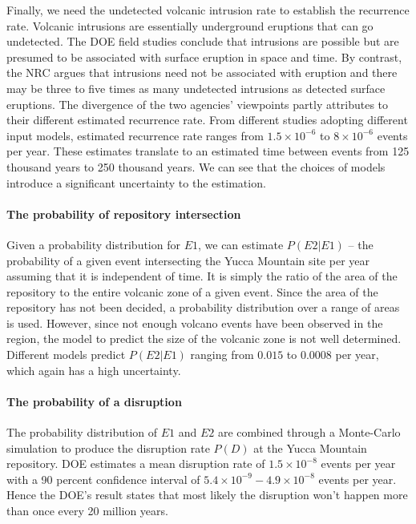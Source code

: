 \documentclass[nofootinbib,preprint,aps]{revtex4-1}
\begin{document}
        Finally, we need the undetected volcanic intrusion rate to establish the recurrence rate. Volcanic
        intrusions are essentially underground eruptions that can go undetected. The DOE field studies conclude
        that intrusions are possible but are presumed to be associated with surface eruption in space and time. 
        By contrast, the NRC argues that intrusions need not be associated with eruption and there
        may be three to five times as many undetected intrusions as detected surface eruptions. The divergence
        of the two agencies' viewpoints partly attributes to their different estimated recurrence rate.
        From different studies adopting different input models, estimated recurrence rate ranges from
        $1.5\times 10^{-6}$ to $8\times 10^{-6}$ events per year. These estimates translate to an estimated
        time between events from 125 thousand years to 250 thousand years. We can see that the choices of
        models introduce a significant uncertainty to the estimation.\cite{cv14}

        \paragraph{The probability of repository intersection}
        Given a probability distribution for $E1$, we can estimate $P(E2|E1)$ -- the probability of
        a given event intersecting the Yucca Mountain site per year assuming that it is independent
        of time. It is simply the ratio of the area of
        the repository to the entire volcanic zone of a given event. Since the area of the repository
        has not been decided, a probability distribution over a range of areas is used.
        However, since not enough volcano events have been observed in the region, the model
        to predict the size of the volcanic zone is not well determined.
        Different models predict $P(E2|E1)$ ranging from $0.015$ to $0.0008$ per year, which again has a high
        uncertainty.

        \paragraph{The probability of a disruption} The probability distribution of $E1$ and $E2$
        are combined through a Monte-Carlo simulation to produce the disruption rate $P(D)$
        at the Yucca Mountain repository. DOE estimates a mean disruption rate of $1.5\times 10^{-8}$ events
        per year with
        a 90 percent confidence interval of $5.4\times 10^{-9}-4.9\times 10^{-8}$ events per year. Hence the DOE's result
        states that most likely the disruption won't happen more than once every 20 million years.
\end{document}
